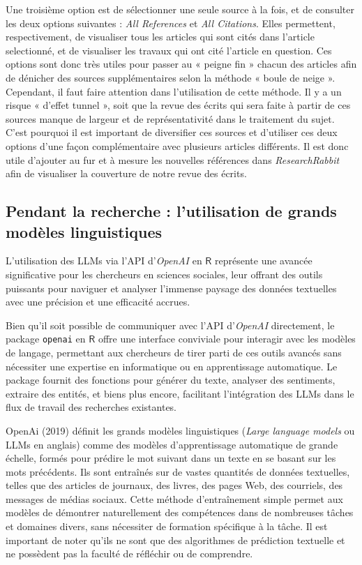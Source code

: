 \documentclass[
  letterpaper,
  DIV=11,
  numbers=noendperiod,
  oneside]{scrreprt}
\begin{document}
Une troisième option est de sélectionner une seule source à la fois, et
de consulter les deux options suivantes : \emph{All References} et
\emph{All Citations}. Elles permettent, respectivement, de visualiser
tous les articles qui sont cités dans l'article selectionné, et de
visualiser les travaux qui ont cité l'article en question. Ces options
sont donc très utiles pour passer au « peigne fin » chacun des articles
afin de dénicher des sources supplémentaires selon la méthode « boule de
neige ». Cependant, il faut faire attention dans l'utilisation de cette
méthode. Il y a un risque « d'effet tunnel », soit que la revue des
écrits qui sera faite à partir de ces sources manque de largeur et de
représentativité dans le traitement du sujet. C'est pourquoi il est
important de diversifier ces sources et d'utiliser ces deux options
d'une façon complémentaire avec plusieurs articles différents. Il est
donc utile d'ajouter au fur et à mesure les nouvelles références dans
\emph{ResearchRabbit} afin de visualiser la couverture de notre revue
des écrits.

\hypertarget{pendant-la-recherche-lutilisation-de-grands-moduxe8les-linguistiques}{%
\subsection{Pendant la recherche : l'utilisation de grands modèles
linguistiques}\label{pendant-la-recherche-lutilisation-de-grands-moduxe8les-linguistiques}}

L'utilisation des LLMs via l'API d'\emph{OpenAI} en \(\textsf{R}\)
représente une avancée significative pour les chercheurs en sciences
sociales, leur offrant des outils puissants pour naviguer et analyser
l'immense paysage des données textuelles avec une précision et une
efficacité accrues.

Bien qu'il soit possible de communiquer avec l'API d'\emph{OpenAI}
directement, le package \texttt{openai} en \(\textsf{R}\) offre une
interface conviviale pour interagir avec les modèles de langage,
permettant aux chercheurs de tirer parti de ces outils avancés sans
nécessiter une expertise en informatique ou en apprentissage
automatique. Le package fournit des fonctions pour générer du texte,
analyser des sentiments, extraire des entités, et biens plus encore,
facilitant l'intégration des LLMs dans le flux de travail des recherches
existantes.

OpenAi (2019) définit les grands modèles linguistiques (\emph{Large
language models} ou LLMs en anglais) comme des modèles d'apprentissage
automatique de grande échelle, formés pour prédire le mot suivant dans
un texte en se basant sur les mots précédents. Ils sont entraînés sur de
vastes quantités de données textuelles, telles que des articles de
journaux, des livres, des pages Web, des courriels, des messages de
médias sociaux. Cette méthode d'entraînement simple permet aux modèles
de démontrer naturellement des compétences dans de nombreuses tâches et
domaines divers, sans nécessiter de formation spécifique à la tâche. Il
est important de noter qu'ils ne sont que des algorithmes de prédiction
textuelle et ne possèdent pas la faculté de réfléchir ou de comprendre.
\end{document}
